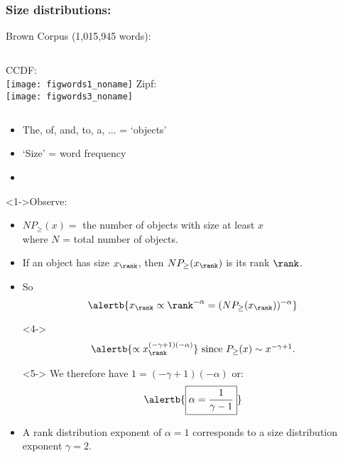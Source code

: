 \begin{frame}
  \frametitle{Size distributions:}

  \begin{block}{Brown Corpus (1,015,945 words):}
    \begin{columns}
      CCDF:\\
      \texttt{[image: figwords1\_noname]}
      Zipf:\\
      \texttt{[image: figwords3\_noname]}
    \end{columns}

  \end{block}

  \begin{block}{}
    \begin{itemize}
    \item 
      The, of, and, to, a, ...  = `objects'
    \item 
      `Size' = word frequency
    \item<2->
    \end{itemize}
  \end{block}

\end{frame}


\begin{frame}

  \begin{block}<1->{Observe:}
    \begin{itemize}
    \item<1-> $ NP_\ge(x) = $ the number of objects with size at least $x$\\
      where $N$ = total number of objects.
    \item<2-> If an object has size $x_\rank$, then $NP_\ge(x_\rank)$ is its rank $\rank$.
    \item<3-> So 
      $$\alertb{x_\rank \propto \rank^{-\alpha} = (NP_\ge(x_\rank))^{-\alpha}}$$
    \item[]<4-> 
      $$
      \alertb{ \propto x_\rank^{(-\gamma+1)(-\alpha)}}
      \mbox{\ since $P_\ge(x) \sim x^{-\gamma+1}$}.
      $$
    \item[]<5-> 
      We therefore have $1=(-\gamma+1)(-\alpha)$ or:
      $$
      \alertb{
        \boxed{\alpha = \frac{1}{\gamma-1}}
      }
      $$
    \item<6-> 
      A rank distribution exponent of $\alpha = 1$ 
      corresponds to a size distribution exponent $\gamma=2$.
    \end{itemize}
  \end{block}

\end{frame}


